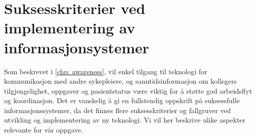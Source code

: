 \section{Suksesskriterier ved implementering av informasjonsystemer}
\label{chp: suksesskriterier}

Som beskrevet i \ref{chp: awareness}, vil enkel tilgang til teknologi for kommunikasjon med andre sykepleiere, og sanntidsinformasjon om kollegers tilgjengelighet, oppgaver og pasientstatus være viktig for å støtte god arbeidsflyt og koordinasjon. 
Det er vanskelig å gi en fullstendig oppskrift på suksessfulle informasjonssystemer, da det finnes flere suksesskriterier og fallgruver ved utvikling og implementering av ny teknologi. Vi vil her beskrive ulike aspekter relevante for vår oppgave.
